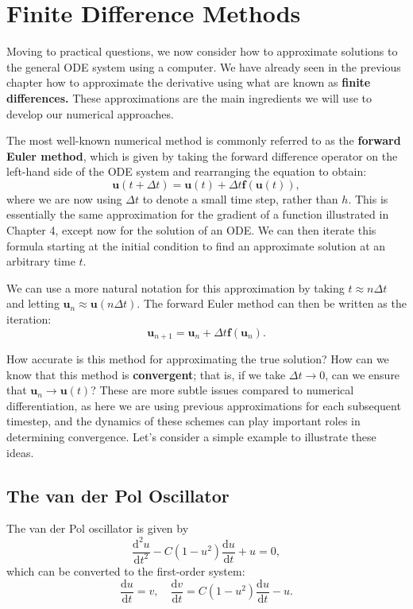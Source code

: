 \documentclass[
  letterpaper,
  DIV=11,
  numbers=noendperiod]{scrreprt}
\begin{document}
\section{Finite Difference Methods}\label{finite-difference-methods}

Moving to practical questions, we now consider how to approximate
solutions to the general ODE system using a computer. We have already
seen in the previous chapter how to approximate the derivative using
what are known as \textbf{finite differences.} These approximations are
the main ingredients we will use to develop our numerical approaches.

The most well-known numerical method is commonly referred to as the
\textbf{forward Euler method}, which is given by taking the forward
difference operator on the left-hand side of the ODE system and
rearranging the equation to obtain: \[
\mathbf{u}(t + \Delta t) = \mathbf{u}(t) + \Delta t \mathbf{f}(\mathbf{u}(t)),
\] where we are now using \(\Delta t\) to denote a small time step,
rather than \(h\). This is essentially the same approximation for the
gradient of a function illustrated in Chapter 4, except now for the
solution of an ODE. We can then iterate this formula starting at the
initial condition to find an approximate solution at an arbitrary time
\(t\).

We can use a more natural notation for this approximation by taking
\(t \approx n\Delta t\) and letting
\(\mathbf{u}_n \approx \mathbf{u}(n\Delta t)\). The forward Euler method
can then be written as the iteration: \[
\mathbf{u}_{n+1} = \mathbf{u}_n + \Delta t \mathbf{f}(\mathbf{u}_n).
\]

How accurate is this method for approximating the true solution? How can
we know that this method is \textbf{convergent}; that is, if we take
\(\Delta t \to 0\), can we ensure that
\(\mathbf{u}_n \to \mathbf{u}(t)\)? These are more subtle issues
compared to numerical differentiation, as here we are using previous
approximations for each subsequent timestep, and the dynamics of these
schemes can play important roles in determining convergence. Let's
consider a simple example to illustrate these ideas.

\subsection{The van der Pol
Oscillator}\label{the-van-der-pol-oscillator}

The van der Pol oscillator is given by \[
\frac{\mathrm{d}^2 u}{\mathrm{d} t^2} - C\left(1-u^2 \right )\frac{\mathrm{d} u}{\mathrm{d} t} + u = 0,
\] which can be converted to the first-order system: \[
\frac{\mathrm{d} u}{\mathrm{d} t} = v, \quad \frac{\mathrm{d}v}{\mathrm{d} t} = C\left(1-u^2\right)\frac{\mathrm{d} u}{\mathrm{d} t} - u.
\]
\end{document}
